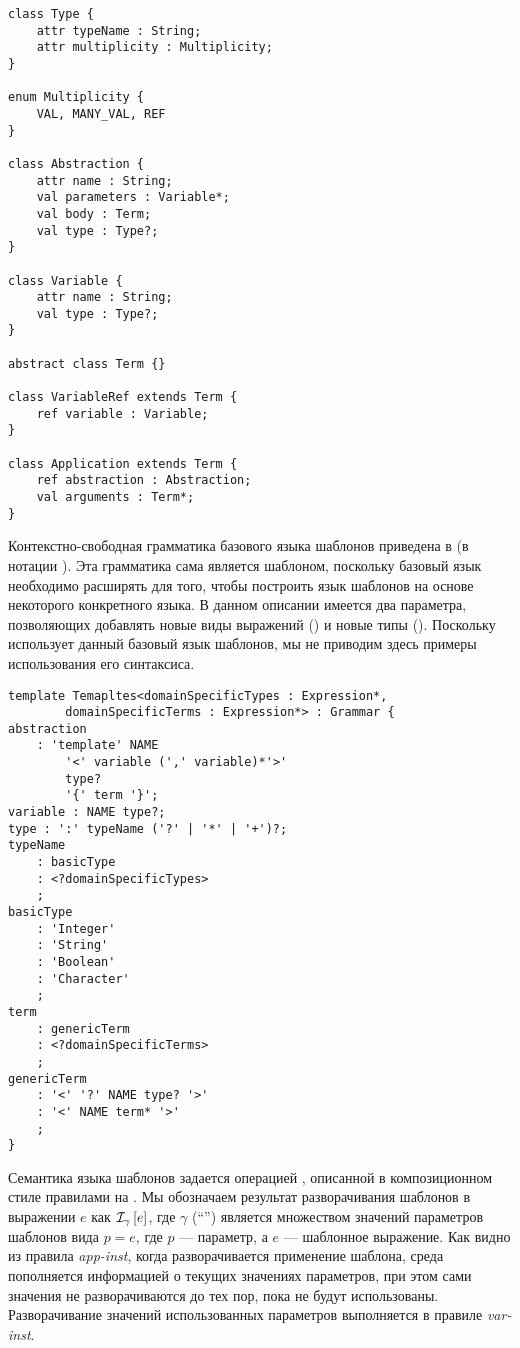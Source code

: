 \begin{lstlisting}[label=TempMM,float=htbp,caption=Базовая мета-модель языка шаблонов]
class Type {
	attr typeName : String;
	attr multiplicity : Multiplicity;
}

enum Multiplicity {
	VAL, MANY_VAL, REF
}

class Abstraction {
	attr name : String;
	val parameters : Variable*;
	val body : Term;
	val type : Type?;
}

class Variable {
	attr name : String;
	val type : Type?;
}

abstract class Term {}

class VariableRef extends Term {
	ref variable : Variable;
}

class Application extends Term {
	ref abstraction : Abstraction;
	val arguments : Term*;
}
\end{lstlisting}

Контекстно-свободная грамматика базового языка шаблонов приведена в  (в нотации \GRM{}). Эта грамматика сама является шаблоном, поскольку базовый язык необходимо расширять для того, чтобы построить язык шаблонов на основе некоторого конкретного языка. В данном описании имеется два параметра, позволяющих добавлять новые виды выражений () и новые типы (). Поскольку \GRM{} использует данный базовый язык шаблонов, мы не приводим здесь примеры использования его синтаксиса.

\begin{lstlisting}[label=TempG,float=htbp,caption=Базовый синтаксис языка шаблонов]
template Temapltes<domainSpecificTypes : Expression*, 
		domainSpecificTerms : Expression*> : Grammar {
abstraction 
	: 'template' NAME 
		'<' variable (',' variable)*'>' 
		type? 
		'{' term '}';
variable : NAME type?;
type : ':' typeName ('?' | '*' | '+')?;
typeName
	: basicType
	: <?domainSpecificTypes>
	;
basicType
	: 'Integer'
	: 'String'
	: 'Boolean'
	: 'Character'
	;
term
	: genericTerm
	: <?domainSpecificTerms>
	;
genericTerm
	: '<' '?' NAME type? '>'
	: '<' NAME term* '>'
	;
}
\end{lstlisting}

\newcommand{\rref}[1]{\mbox{\textit{#1}}}

Семантика языка шаблонов задается операцией , описанной в композиционном стиле правилами на . Мы обозначаем результат разворачивания шаблонов в выражении $e$ как $\mathcal{I}_{\gamma} \left[ e \right]$, где $\gamma$ (``'') является множеством значений параметров шаблонов вида $p = e$, где $p$ --- параметр, а $e$ --- шаблонное выражение. Как видно из правила \rref{app-inst}, когда разворачивается применение шаблона, среда пополняется информацией о текущих значениях параметров, при этом сами значения не разворачиваются до тех пор, пока не будут использованы. Разворачивание значений использованных параметров выполняется в правиле \rref{var-inst}.

